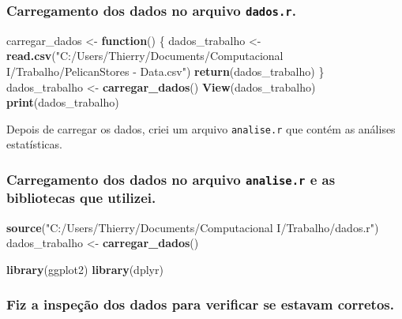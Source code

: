 \documentclass[
]{article}
\newenvironment{Shaded}{\begin{snugshade}}{\end{snugshade}}
\newcommand{\ControlFlowTok}[1]{\textcolor[rgb]{0.13,0.29,0.53}{\textbf{#1}}}
\newcommand{\FunctionTok}[1]{\textcolor[rgb]{0.13,0.29,0.53}{\textbf{#1}}}
\newcommand{\NormalTok}[1]{#1}
\newcommand{\OtherTok}[1]{\textcolor[rgb]{0.56,0.35,0.01}{#1}}
\newcommand{\StringTok}[1]{\textcolor[rgb]{0.31,0.60,0.02}{#1}}
\begin{document}
\subsubsection{\texorpdfstring{Carregamento dos dados no arquivo
\texttt{dados.r}.}{Carregamento dos dados no arquivo dados.r.}}\label{carregamento-dos-dados-no-arquivo-dados.r.}

\begin{Shaded}
\begin{Highlighting}[]
\NormalTok{carregar\_dados }\OtherTok{\textless{}{-}} \ControlFlowTok{function}\NormalTok{() \{}
\NormalTok{  dados\_trabalho }\OtherTok{\textless{}{-}} \FunctionTok{read.csv}\NormalTok{(}\StringTok{"C:/Users/Thierry/Documents/Computacional I/Trabalho/PelicanStores {-} Data.csv"}\NormalTok{)}
  \FunctionTok{return}\NormalTok{(dados\_trabalho)}
\NormalTok{\}}
\NormalTok{dados\_trabalho }\OtherTok{\textless{}{-}} \FunctionTok{carregar\_dados}\NormalTok{()}
\FunctionTok{View}\NormalTok{(dados\_trabalho)}
\FunctionTok{print}\NormalTok{(dados\_trabalho)}
\end{Highlighting}
\end{Shaded}

Depois de carregar os dados, criei um arquivo \texttt{analise.r} que
contém as análises estatísticas.

\subsubsection{\texorpdfstring{Carregamento dos dados no arquivo
\texttt{analise.r} e as bibliotecas que
utilizei.}{Carregamento dos dados no arquivo analise.r e as bibliotecas que utilizei.}}\label{carregamento-dos-dados-no-arquivo-analise.r-e-as-bibliotecas-que-utilizei.}

\begin{Shaded}
\begin{Highlighting}[]
\FunctionTok{source}\NormalTok{(}\StringTok{"C:/Users/Thierry/Documents/Computacional I/Trabalho/dados.r"}\NormalTok{)}
\NormalTok{dados\_trabalho }\OtherTok{\textless{}{-}} \FunctionTok{carregar\_dados}\NormalTok{()}

\FunctionTok{library}\NormalTok{(ggplot2)}
\FunctionTok{library}\NormalTok{(dplyr)}
\end{Highlighting}
\end{Shaded}

\subsubsection{Fiz a inspeção dos dados para verificar se estavam
corretos.}\label{fiz-a-inspeuxe7uxe3o-dos-dados-para-verificar-se-estavam-corretos.}
\end{document}
